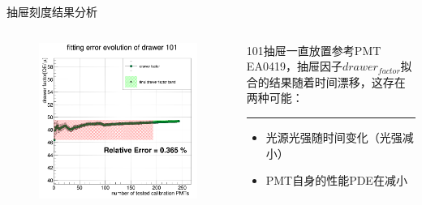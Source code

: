 \documentclass[11pt,compress,xcolor=x11names,UTF8]{beamer}
\begin{document}
\begin{frame}{抽屉刻度结果分析}
\begin{columns}
\begin{column}{.5\textwidth}
\begin{figure}
\centering
\includegraphics[width=\textwidth]{lt101} %
\end{figure}
\end{column}
\begin{column}{.45\textwidth}
101抽屉一直放置参考PMT EA0419，抽屉因子$drawer_{factor}$拟合的结果随着时间漂移，这存在两种可能：
\vspace{.5cm}
\hrule{\textwidth}
\vspace{.5cm}
\begin{itemize}
\item 光源光强随时间变化（光强减小）
\item PMT自身的性能PDE在减小
\end{itemize}

\end{column}
\end{columns}
\end{frame}
\end{document}
